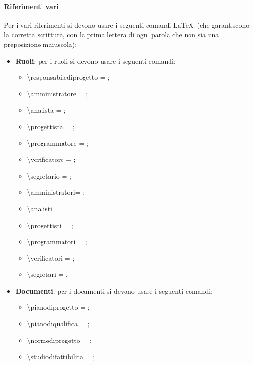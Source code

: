 \documentclass[../NormeDiProgetto.tex]{subfiles}
\begin{document}
				\paragraph{Riferimenti vari\\}
					Per i vari riferimenti si devono usare i seguenti comandi \LaTeX\ (che
					garantiscono la corretta scrittura, con la prima lettera di ogni parola che non
					sia una preposizione maiuscola):
					\begin{itemize}
						\item \textbf{Ruoli}: per i ruoli si devono usare i seguenti comandi:
						\begin{itemize}
							\item \textbackslash responsabilediprogetto =
							\responsabilediprogetto; 
							\item \textbackslash amministratore = \amministratore;
							\item \textbackslash analista = \analista;
							\item \textbackslash progettista = \progettista;
							\item \textbackslash programmatore = \programmatore;
							\item \textbackslash verificatore = \verificatore;
							\item \textbackslash segretario = \segretario;
							\item \textbackslash amministratori= \amministratori;
							\item \textbackslash analisti = \analisti;
							\item \textbackslash progettisti = \progettisti;
							\item \textbackslash programmatori = \programmatori;
							\item \textbackslash verificatori = \verificatori;
							\item \textbackslash segretari = \segretari.
						\end{itemize}	
						\item \textbf{Documenti}: per i documenti si devono usare i seguenti
						comandi:
						\begin{itemize}
							\item \textbackslash pianodiprogetto = \pianodiprogetto;
							\item \textbackslash pianodiqualifica = \pianodiqualifica;
							\item \textbackslash normediprogetto = \normediprogetto;
							\item \textbackslash studiodifattibilita = \studiodifattibilita;

\end{itemize}
\end{itemize}
\end{document}

